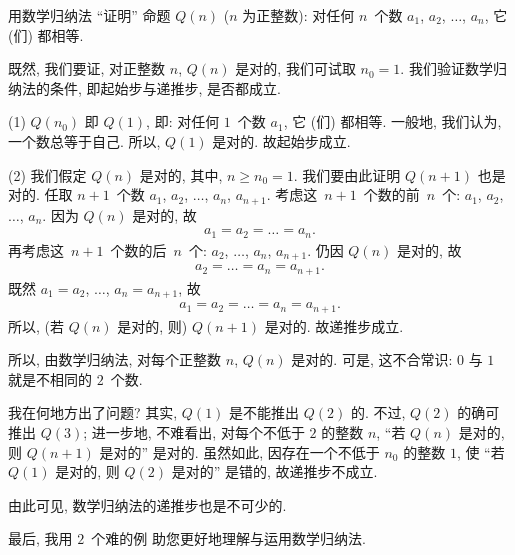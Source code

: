 \documentclass[../libro.tex]{subfiles}
\begin{document}
\begin{example}[缺递推步]
    用数学归纳法 ``证明'' 命题 \(Q(n)\) (\(n\) 为正整数):
    对任何 \(n\)~个数 \(a_1\), \(a_2\), \(\dots\), \(a_n\),
    它 (们) 都相等.

    既然, 我们要证, 对正整数 \(n\),
    \(Q(n)\) 是对的,
    我们可试取 \(n_0 = 1\).
    我们验证数学归纳法的条件,
    即起始步与递推步,
    是否都成立.

    (1)
    \(Q(n_0)\) 即 \(Q(1)\), 即:
    对任何 \(1\)~个数 \(a_1\), 它 (们) 都相等.
    一般地, 我们认为, 一个数总等于自己.
    所以, \(Q(1)\) 是对的.
    故起始步成立.

    (2)
    我们假定 \(Q(n)\) 是对的, 其中, \(n \geq n_0 = 1\).
    我们要由此证明 \(Q(n+1)\) 也是对的.
    任取 \(n+1\)~个数
    \(a_1\), \(a_2\), \(\dots\), \(a_n\), \(a_{n+1}\).
    考虑这~\(n+1\)~个数的前~\(n\)~个:
    \(a_1\), \(a_2\), \(\dots\), \(a_n\).
    因为 \(Q(n)\) 是对的, 故
    \begin{align*}
        a_1 = a_2 = \dots = a_n.
    \end{align*}
    再考虑这~\(n+1\)~个数的后~\(n\)~个:
    \(a_2\), \(\dots\), \(a_n\), \(a_{n+1}\).
    仍因 \(Q(n)\) 是对的, 故
    \begin{align*}
        a_2 = \dots = a_n = a_{n+1}.
    \end{align*}
    既然 \(a_1 = a_2\), \(\dots\), \(a_n = a_{n+1}\), 故
    \begin{align*}
        a_1 = a_2 = \dots = a_n = a_{n+1}.
    \end{align*}
    所以, (若 \(Q(n)\) 是对的, 则) \(Q(n+1)\) 是对的.
    故递推步成立.

    所以, 由数学归纳法,
    对每个正整数 \(n\), \(Q(n)\) 是对的.
    可是, 这不合常识:
    \(0\) 与 \(1\) 就是不相同的 \(2\)~个数.

    我在何地方出了问题?
    其实, \(Q(1)\) 是不能推出 \(Q(2)\) 的.
    不过, \(Q(2)\) 的确可推出 \(Q(3)\);
    进一步地, 不难看出, 对每个不低于 \(2\) 的整数 \(n\),
    ``若 \(Q(n)\) 是对的, 则 \(Q(n+1)\) 是对的''
    是对的.
    虽然如此,
    因存在一个不低于 \(n_0\) 的整数 \(1\),
    使 ``若 \(Q(1)\) 是对的, 则 \(Q(2)\) 是对的''
    是错的,
    故递推步不成立.

    由此可见, 数学归纳法的递推步也是不可少的.
\end{example}

最后, 我用 \(2\)~个难的例%
助您更好地理解与运用数学归纳法.
\end{document}
